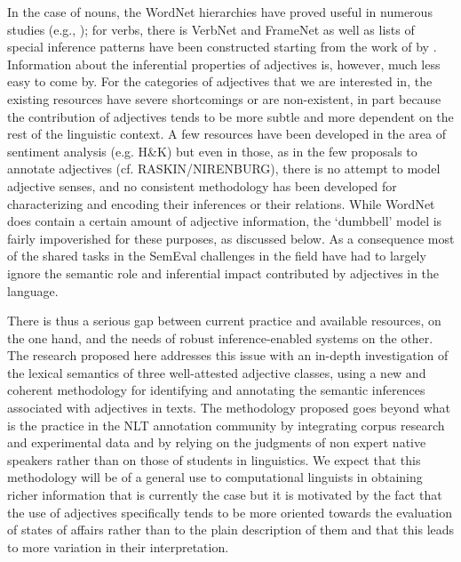 \documentclass[10pt]{article}
\begin{document}


In the case of nouns, the WordNet hierarchies have proved useful in numerous studies (e.g., \cite{snow04}); for verbs, there is VerbNet and FrameNet as well as lists of special inference patterns have been constructed starting from the work of \cite{kiparsky+kiparsky:1970,karttunen:1971} by \cite{nairn+condoravdi+karttunen:2006,sauri:2008phd,factbank:2009,lotan:2012}. Information about the inferential properties of adjectives is, however, much less easy to come by. For the categories of adjectives that we are interested in, the existing resources have severe shortcomings or are non-existent, in part because the contribution of adjectives tends to be more subtle and more dependent on the rest of the linguistic context. A few resources have been developed in the area of sentiment analysis (e.g. H\&K) but even in those, as in the few proposals to annotate adjectives (cf. RASKIN/NIRENBURG), there is no attempt to model adjective senses, and no consistent methodology has been developed for characterizing and encoding their inferences or their relations. While WordNet does contain a certain amount of adjective information, the `dumbbell' model is fairly impoverished for these purposes, as discussed below. As a consequence most of the shared tasks in the SemEval challenges in the field have had to largely ignore the semantic role and inferential impact contributed by adjectives in the language.

There is thus a serious gap between current practice and available resources, on the one hand, and the needs of robust inference-enabled systems on the other. The research proposed here addresses this issue with an in-depth investigation of the lexical semantics of three well-attested adjective classes, using a new and coherent methodology for identifying and annotating the semantic inferences associated with adjectives in texts. The methodology proposed goes beyond what is the practice in the NLT annotation community by integrating corpus research and experimental data and by relying on the judgments of non expert native speakers rather than on those of students in linguistics. We expect that this methodology will be of a general use to computational linguists in obtaining richer information that is currently the case but it is motivated by the fact that the use of adjectives specifically tends to be more oriented towards the evaluation of states of affairs rather than to the plain description of them and that this leads to more variation in their interpretation. 
\end{document}
